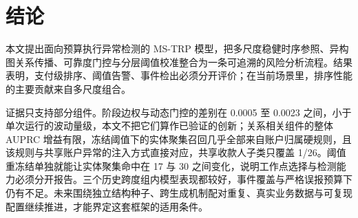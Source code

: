 \documentclass[twocolumn,11pt]{ctexart}
\begin{document}
\section{结论}
本文提出面向预算执行异常检测的 MS-TRP 模型，把多尺度稳健时序参照、异构图关系传播、可靠度门控与分层阈值校准整合为一条可追溯的风险分析流程。结果表明，支付级排序、阈值告警、事件检出必须分开评价；在当前场景里，排序性能的主要贡献来自多尺度组合。

证据只支持部分组件。阶段边权与动态门控的差别在 0.0005 至 0.0023 之间，小于单次运行的波动量级，本文不把它们算作已验证的创新；关系相关组件的整体 AUPRC 增益有限，冻结阈值下的实体聚集召回几乎全部来自账户归属硬规则，且该规则与共享账户异常的注入方式直接对应，共享收款人子类只覆盖 1/26。阈值重冻结单独就能让实体聚集命中在 17 与 30 之间变化，说明工作点选择与检测能力必须分开报告。三个历史跨度组内模型表现都较好，事件覆盖与严格误报预算下仍有不足。未来围绕独立结构种子、跨生成机制配对重复、真实业务数据与可复现配置继续推进，才能界定这套框架的适用条件。
\end{document}
